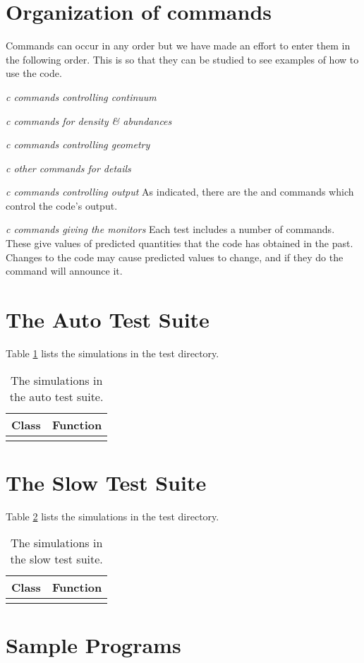 \section{Organization of commands}

Commands can occur in any order but we have made an effort to
enter them in the following order.
This is so that they can be studied to see examples of how to
use the code.

\emph{c commands controlling continuum}

\emph{c commands for density \& abundances}

\emph{c commands controlling geometry}

\emph{c other commands for details}

\emph{c commands controlling output}
As indicated, there are the  and  commands
which control the code's output.

\emph{c commands giving the monitors}
Each test includes a number of  commands.
These give values of predicted quantities that the code has
obtained in the past.
Changes to the code may cause predicted values to change,
and if they do the  command will
announce it.

\section{The Auto Test Suite}

Table \ref{tab:AutoSimulationList} lists the simulations in the 
 test directory.

\begin{table}
\centering
\caption{
The simulations in the auto test suite.}
\begin{tabular}{ c c  }
\hline
Class & Function \\
\hline

\hline
\label{tab:AutoSimulationList}
\end{tabular}
\end{table}



\section{The Slow Test Suite}

Table \ref{tab:SlowSimulationList} lists the simulations in the
 test directory.

\begin{table}
\centering
\caption{
The simulations in the slow test suite.}
\begin{tabular}{ c c  }
\hline
Class & Function \\
\hline

\hline
\label{tab:SlowSimulationList}
\end{tabular}
\end{table}




\section{Sample Programs} 